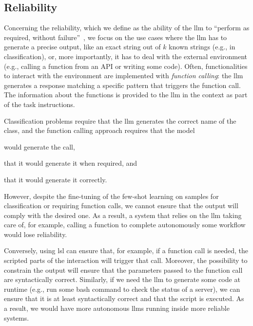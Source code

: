 \documentclass[manuscript,screen]{acmart}
\begin{document}
\subsection{Reliability}
\label{sec:reliability}

Concerning the reliability, which we define as the ability of the \ac{llm} to \enquote{perform as required, without failure}~\cite{ai2023artificial}, we focus on the use cases where the \ac{llm} has to generate a precise output, like an exact string out of $k$ known strings (e.g., in classification), or, more importantly, it has to deal with the external environment (e.g., calling a function from an API or writing some code).
Often, functionalities to interact with the environment are implemented with \emph{function calling}: the \ac{llm} generates a response matching a specific pattern that triggers the function call.
The information about the functions is provided to the \ac{llm} in the context as part of the task instructions.

Classification problems require that the \ac{llm} generates the correct name of the class, and the function calling approach requires that the model
\begin{enumerate*}[label=(\arabic*)]
    \item would generate the call,
    \item that it would generate it when required, and
    \item that it would generate it correctly.
\end{enumerate*}
However, despite the fine-tuning of the few-shot learning on samples for classification or requiring function calls, we cannot ensure that the output will comply with the desired one.
As a result, a system that relies on the \ac{llm} taking care of, for example, calling a function to complete autonomously some workflow would lose reliability.

Conversely, using \ac{lsl} can ensure that, for example, if a function call is needed, the scripted parts of the interaction will trigger that call.
Moreover, the possibility to constrain the output will ensure that the parameters passed to the function call are syntactically correct.
Similarly, if we need the \ac{llm} to generate some code at runtime (e.g., run some bash command to check the status of a server), we can ensure that it is at least syntactically correct and that the script is executed.
As a result, we would have more autonomous \acp{llm} running inside more reliable systems.
\end{document}
